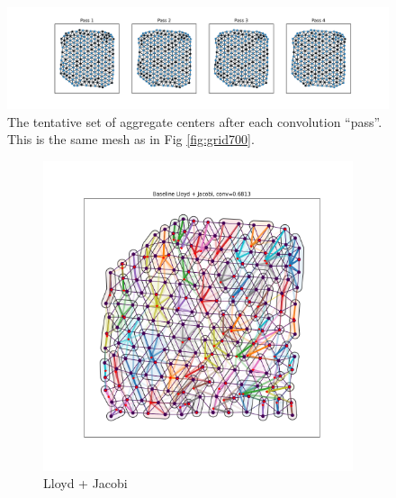 \documentclass{article}
\begin{document}
\begin{figure}[h]
  \centering
  \includegraphics[width=\textwidth, trim=130 0 100 0, clip]{agg_passes.pdf}
  \caption{The tentative set of aggregate centers after each convolution ``pass''.  This is the same mesh as in Fig \ref{fig:grid700}.}
  \label{fig:agg_passes}
\end{figure}

\begin{figure}[h]
  \centering
  \begin{subfigure}[t]{0.49\textwidth}
    \centering
    \includegraphics[width=\textwidth, trim=80 70 70 50, clip]{anis_grid_3_lloyd.pdf}
    \caption{Lloyd + Jacobi}
  \end{subfigure}
  \begin{subfigure}[t]{0.49\textwidth}
    \centering

\end{subfigure}
\end{figure}
\end{document}
